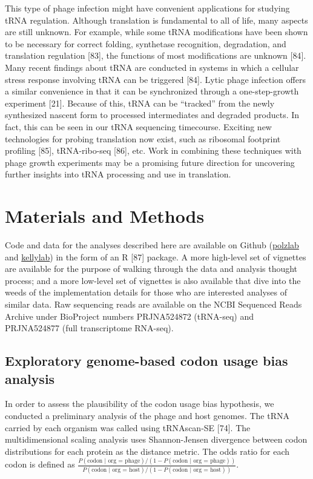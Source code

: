 \documentclass[12pt,twoside]{mitthesis-manusdown}
\begin{document}
This type of phage infection might have convenient applications for
studying tRNA regulation. Although translation is fundamental to all of
life, many aspects are still unknown. For example, while some tRNA
modifications have been shown to be necessary for correct folding,
synthetase recognition, degradation, and translation regulation
{[}83{]}, the functions of most modifications are unknown {[}84{]}. Many
recent findings about tRNA are conducted in systems in which a cellular
stress response involving tRNA can be triggered {[}84{]}. Lytic phage
infection offers a similar convenience in that it can be synchronized
through a one-step-growth experiment {[}21{]}. Because of this, tRNA can
be ``tracked'' from the newly synthesized nascent form to processed
intermediates and degraded products. In fact, this can be seen in our
tRNA sequencing timecourse. Exciting new technologies for probing
translation now exist, such as ribosomal footprint profiling {[}85{]},
tRNA-ribo-seq {[}86{]}, etc. Work in combining these techniques with
phage growth experiments may be a promising future direction for
uncovering further insights into tRNA processing and use in translation.

\section{Materials and Methods}\label{materials-and-methods}

Code and data for the analyses described here are available on Github
(\href{https://github.com/polzlab}{polzlab} and
\href{https://github.com/kellylab}{kellylab}) in the form of an R
{[}87{]} package. A more high-level set of vignettes are available for
the purpose of walking through the data and analysis thought process;
and a more low-level set of vignettes is also available that dive into
the weeds of the implementation details for those who are interested
analyses of similar data. Raw sequencing reads are available on the NCBI
Sequenced Reads Archive under BioProject numbers PRJNA524872 (tRNA-seq)
and PRJNA524877 (full transcriptome RNA-seq).

\subsection{Exploratory genome-based codon usage bias
analysis}\label{exploratory-genome-based-codon-usage-bias-analysis}

In order to assess the plausibility of the codon usage bias hypothesis,
we conducted a preliminary analysis of the phage and host genomes. The
tRNA carried by each organism was called using tRNAscan-SE {[}74{]}. The
multidimensional scaling analysis uses Shannon-Jensen divergence between
codon distributions for each protein as the distance metric. The odds
ratio for each codon is defined as
\(\frac{P(\text{codon | org = phage})/(1-P(\text{codon | org = phage}))}{P(\text{codon | org = host})/(1-P(\text{codon | org = host}))}\).
\end{document}
